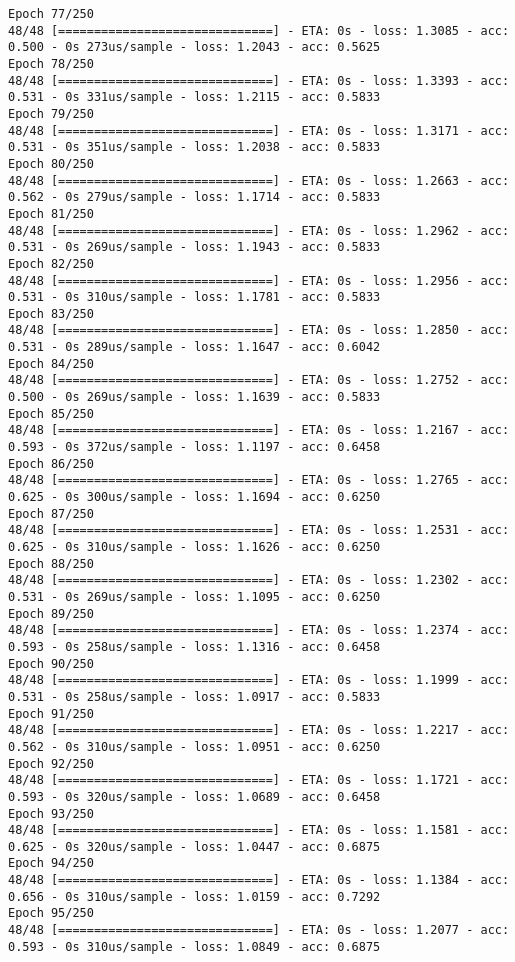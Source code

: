 \documentclass[11pt]{article}
\begin{document}
\begin{Verbatim}[commandchars=\\\{\}]
Epoch 77/250
48/48 [==============================] - ETA: 0s - loss: 1.3085 - acc: 0.500 - 0s 273us/sample - loss: 1.2043 - acc: 0.5625
Epoch 78/250
48/48 [==============================] - ETA: 0s - loss: 1.3393 - acc: 0.531 - 0s 331us/sample - loss: 1.2115 - acc: 0.5833
Epoch 79/250
48/48 [==============================] - ETA: 0s - loss: 1.3171 - acc: 0.531 - 0s 351us/sample - loss: 1.2038 - acc: 0.5833
Epoch 80/250
48/48 [==============================] - ETA: 0s - loss: 1.2663 - acc: 0.562 - 0s 279us/sample - loss: 1.1714 - acc: 0.5833
Epoch 81/250
48/48 [==============================] - ETA: 0s - loss: 1.2962 - acc: 0.531 - 0s 269us/sample - loss: 1.1943 - acc: 0.5833
Epoch 82/250
48/48 [==============================] - ETA: 0s - loss: 1.2956 - acc: 0.531 - 0s 310us/sample - loss: 1.1781 - acc: 0.5833
Epoch 83/250
48/48 [==============================] - ETA: 0s - loss: 1.2850 - acc: 0.531 - 0s 289us/sample - loss: 1.1647 - acc: 0.6042
Epoch 84/250
48/48 [==============================] - ETA: 0s - loss: 1.2752 - acc: 0.500 - 0s 269us/sample - loss: 1.1639 - acc: 0.5833
Epoch 85/250
48/48 [==============================] - ETA: 0s - loss: 1.2167 - acc: 0.593 - 0s 372us/sample - loss: 1.1197 - acc: 0.6458
Epoch 86/250
48/48 [==============================] - ETA: 0s - loss: 1.2765 - acc: 0.625 - 0s 300us/sample - loss: 1.1694 - acc: 0.6250
Epoch 87/250
48/48 [==============================] - ETA: 0s - loss: 1.2531 - acc: 0.625 - 0s 310us/sample - loss: 1.1626 - acc: 0.6250
Epoch 88/250
48/48 [==============================] - ETA: 0s - loss: 1.2302 - acc: 0.531 - 0s 269us/sample - loss: 1.1095 - acc: 0.6250
Epoch 89/250
48/48 [==============================] - ETA: 0s - loss: 1.2374 - acc: 0.593 - 0s 258us/sample - loss: 1.1316 - acc: 0.6458
Epoch 90/250
48/48 [==============================] - ETA: 0s - loss: 1.1999 - acc: 0.531 - 0s 258us/sample - loss: 1.0917 - acc: 0.5833
Epoch 91/250
48/48 [==============================] - ETA: 0s - loss: 1.2217 - acc: 0.562 - 0s 310us/sample - loss: 1.0951 - acc: 0.6250
Epoch 92/250
48/48 [==============================] - ETA: 0s - loss: 1.1721 - acc: 0.593 - 0s 320us/sample - loss: 1.0689 - acc: 0.6458
Epoch 93/250
48/48 [==============================] - ETA: 0s - loss: 1.1581 - acc: 0.625 - 0s 320us/sample - loss: 1.0447 - acc: 0.6875
Epoch 94/250
48/48 [==============================] - ETA: 0s - loss: 1.1384 - acc: 0.656 - 0s 310us/sample - loss: 1.0159 - acc: 0.7292
Epoch 95/250
48/48 [==============================] - ETA: 0s - loss: 1.2077 - acc: 0.593 - 0s 310us/sample - loss: 1.0849 - acc: 0.6875

\end{Verbatim}
\end{document}
